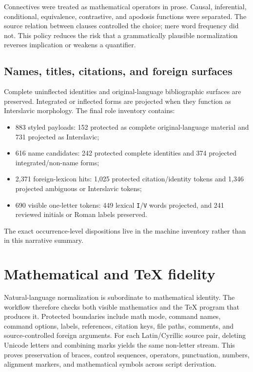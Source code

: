 \documentclass[11pt]{article}
\newcommand{\code}[1]{\texttt{#1}}
\begin{document}
Connectives were treated as mathematical operators in prose. Causal, inferential, conditional, equivalence, contrastive, and apodosis functions were separated. The source relation between clauses controlled the choice; mere word frequency did not. This policy reduces the risk that a grammatically plausible normalization reverses implication or weakens a quantifier.

\subsection{Names, titles, citations, and foreign surfaces}

Complete uninflected identities and original-language bibliographic surfaces are preserved. Integrated or inflected forms are projected when they function as Interslavic morphology. The final role inventory contains:

\begin{itemize}
\item 883 styled payloads: 152 protected as complete original-language material and 731 projected as Interslavic;
\item 616 name candidates: 242 protected complete identities and 374 projected integrated/non-name forms;
\item 2,371 foreign-lexicon hits: 1,025 protected citation/identity tokens and 1,346 projected ambiguous or Interslavic tokens;
\item 690 visible one-letter tokens: 449 lexical \code{I}/\code{V} words projected, and 241 reviewed initials or Roman labels preserved.
\end{itemize}

The exact occurrence-level dispositions live in the machine inventory rather than in this narrative summary.

\section{Mathematical and TeX fidelity}

Natural-language normalization is subordinate to mathematical identity. The workflow therefore checks both visible mathematics and the TeX program that produces it. Protected boundaries include math mode, command names, command options, labels, references, citation keys, file paths, comments, and source-controlled foreign arguments. For each Latin/Cyrillic source pair, deleting Unicode letters and combining marks yields the same non-letter stream. This proves preservation of braces, control sequences, operators, punctuation, numbers, alignment markers, and mathematical symbols across script derivation.
\end{document}
